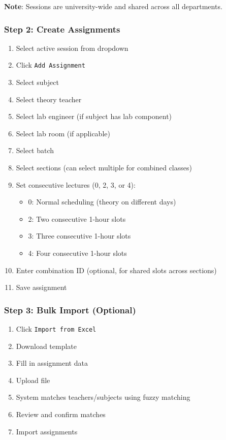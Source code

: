 \documentclass[12pt,a4paper]{article}
\begin{document}
\textbf{Note}: Sessions are university-wide and shared across all departments.

\subsubsection{Step 2: Create Assignments}
\begin{enumerate}
    \item Select active session from dropdown
    \item Click \texttt{Add Assignment}
    \item Select subject
    \item Select theory teacher
    \item Select lab engineer (if subject has lab component)
    \item Select lab room (if applicable)
    \item Select batch
    \item Select sections (can select multiple for combined classes)
    \item Set consecutive lectures (0, 2, 3, or 4):
    \begin{itemize}
        \item 0: Normal scheduling (theory on different days)
        \item 2: Two consecutive 1-hour slots
        \item 3: Three consecutive 1-hour slots
        \item 4: Four consecutive 1-hour slots
    \end{itemize}
    \item Enter combination ID (optional, for shared slots across sections)
    \item Save assignment
\end{enumerate}

\subsubsection{Step 3: Bulk Import (Optional)}
\begin{enumerate}
    \item Click \texttt{Import from Excel}
    \item Download template
    \item Fill in assignment data
    \item Upload file
    \item System matches teachers/subjects using fuzzy matching
    \item Review and confirm matches
    \item Import assignments
\end{enumerate}
\end{document}
